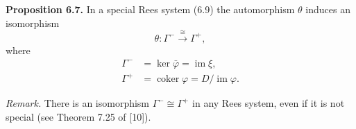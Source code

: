 \textbf{Proposition 6.7.} In a special Rees system (6.9) the automorphism $\theta$ induces an isomorphism
$$\theta : \Gamma^- \xrightarrow{\cong} \Gamma^+,$$
where
\begin{align*}
\Gamma^- &= \ker \bar{\varphi} = \operatorname{im} \xi, \\
\Gamma^+ &= \operatorname{coker} \varphi = D / \operatorname{im} \varphi.
\end{align*}

\textit{Remark.} There is an isomorphism $\Gamma^- \cong \Gamma^+$ in any Rees system, even if it is not special (see Theorem 7.25 of [10]).
